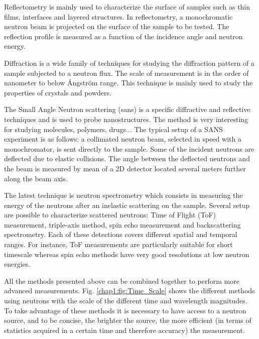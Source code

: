 \begin{refsection}
  Reflectometry is mainly used to characterize the surface of samples such as thin films, interfaces and layered structures. In reflectometry, a monochromatic neutron beam is projected on the surface of the sample to be tested. The reflection profile is measured as a function of the incidence angle and neutron energy.

  Diffraction is a wide family of techniques for studying the diffraction pattern of a sample subjected to a neutron flux. The scale of measurement is in the order of nanometer to below {\AA}ngström range. This technique is mainly used to study the properties of crystals and powders.

  

  The Small Angle Neutron scattering (\acrshort{sans}) is a specific diffractive and reflective techniques and is used to probe nanostructures. The method is very interesting for studying molecules, polymers, drugs... The typical setup of a SANS experiment is as follows: a collimated neutron beam, selected in speed with a monochromator, is sent directly to the sample. Some of the incident neutrons are deflected due to elastic collisions. The angle between the deflected neutrons and the beam is measured by mean of a 2D detector located several meters further along the beam axis.

  The latest technique is neutron spectrometry which consists in measuring the energy of the neutrons after an inelastic scattering on the sample. Several setup are possible to characterize scattered neutrons: Time of Flight (ToF) measurement, triple-axis method, spin echo measurement and backscattering spectrometry. Each of these detections covers different spatial and temporal ranges. For instance, ToF measurements are particularly suitable for short timescale whereas spin echo methods have very good resolutions at low neutron energies.

  All the methods presented above can be combined together to perform more advanced measurements. Fig. \ref{chap1:fig:Time_Scale} shows the different methods using neutrons with the scale of the different time and wavelength magnitudes. To take advantage of these methods it is necessary to have access to a neutron source, and to be concise, the brighter the source, the more efficient (in terms of statistics acquired in a certain time and therefore accuracy) the measurement.

  



\end{refsection}
